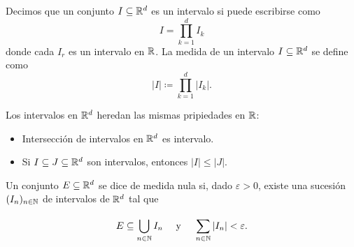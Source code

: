 \begin{definition}
	Decimos que un conjunto $I\subseteq\mathbb{R}^d$ es un intervalo si puede escribirse como
	\[
	I=\prod_{k=1}^{d} I_k
	\]
	donde cada $I_r$ es un intervalo en $\mathbb{R}$. La medida de un intervalo $I\subseteq\mathbb{R}^d$ se define como
	\[
	|I|\coloneq\prod_{k=1}^{d} |I_k|.
	\]
\end{definition}

\begin{note}
	Los intervalos en $\mathbb{R}^d$ heredan las mismas pripiedades en $\mathbb{R}$:

	\begin{itemize}
		\item Intersección de intervalos en $\mathbb{R}^d$ es intervalo.

		\item Si $I\subseteq J\subseteq\mathbb{R}^d$ son intervalos, entonces $|I|\leq|J|$.
	\end{itemize}
\end{note}

\begin{definition}
	Un conjunto $E\subseteq\mathbb{R}^d$ se dice de medida nula si, dado $\varepsilon>0$, existe una sucesión $(I_n)_{n\in\mathbb{N}}$ de intervalos de $\mathbb{R}^d$ tal que

	\[
	E\subseteq\bigcup_{n\in\mathbb{N}} I_n\quad\text{ y }\quad \sum_{n\in\mathbb{N}}^{}|I_n|<\varepsilon.
	\]
\end{definition}

